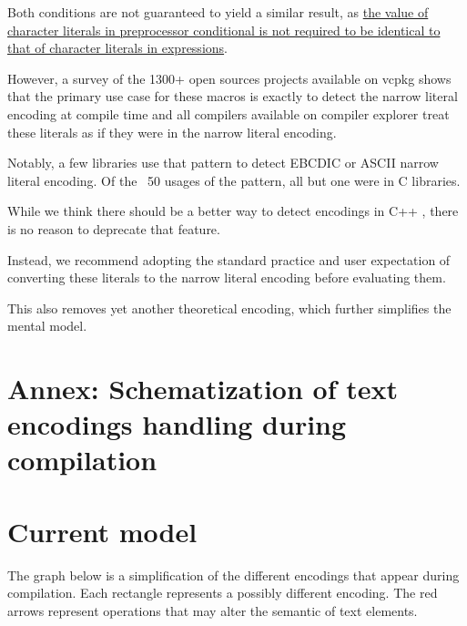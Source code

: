 \documentclass{wg21}
\begin{document}
Both conditions are not guaranteed to yield a similar result, as \href{http://eel.is/c++draft/cpp#cond-12}{the value of character literals in preprocessor conditional is not required to be identical to that of character literals in expressions}.

However, a survey of the 1300+ open sources projects available on vcpkg shows that the primary use case for these macros is exactly to detect the
narrow literal encoding at compile time and all compilers available on compiler explorer treat these literals as if they were in the narrow literal encoding.

Notably, a few libraries use that pattern to detect EBCDIC or ASCII narrow literal encoding.
Of the ~50 usages of the pattern, all but one were in C libraries.

While we think there should be a better way to detect encodings in C++ \cite{P1885R2}, there is no reason to deprecate that feature.

Instead, we recommend adopting the standard practice and user expectation of converting these literals to the narrow literal encoding before evaluating them.

This also removes yet another theoretical encoding, which further simplifies the mental model. 

\pagebreak

\section{Annex: Schematization of text encodings handling during compilation}
\section{Current model}

The graph below is a simplification of the different encodings that appear during compilation.
Each rectangle represents a possibly different encoding.
The red arrows represent operations that may alter the semantic of text elements.

\end{document}
